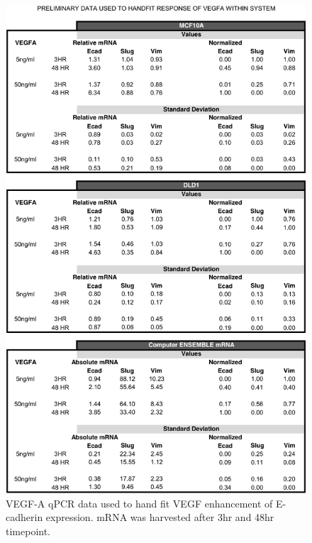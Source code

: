 \newpage

\begin{figure}
	\center
	\includegraphics [width=0.75\linewidth] {./figs/Fig-Supplemental-Data-VEGFA.pdf}
	\caption{VEGF-A qPCR data used to hand fit VEGF enhancement of E-cadherin expression. mRNA was harvested after 3hr and 48hr timepoint.}\label{fg:VEGFA-Data}
\end{figure}


%
